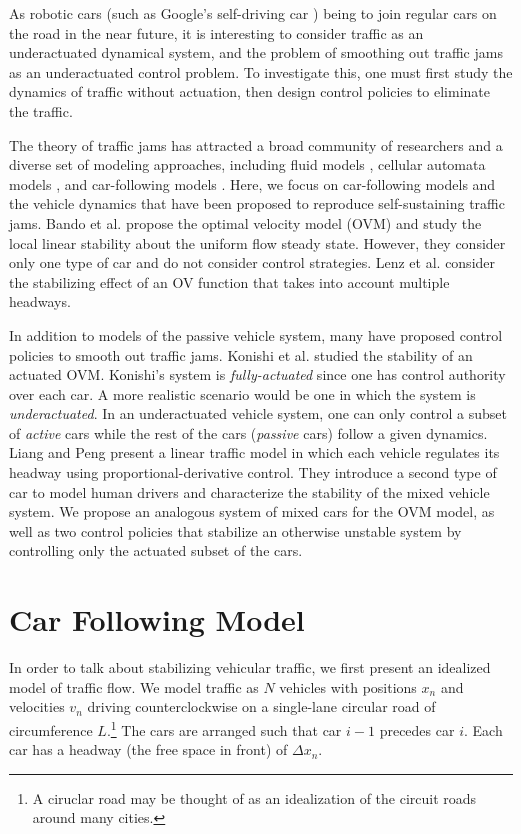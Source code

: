 \documentclass[10pt,twocolumn]{article}
\theoremstyle{ss}
\begin{document}
As robotic cars (such as Google's self-driving car \cite{Thrun}) being to join regular cars on the road in the near future, it is interesting to consider traffic as an underactuated dynamical system, and the problem of smoothing out traffic jams as an underactuated control problem. To investigate this, one must first study the dynamics of traffic without actuation, then design control policies to eliminate the traffic. %

The theory of traffic jams has attracted a broad community of researchers and a diverse set of modeling approaches, including fluid models \cite{Kerner}, cellular automata models \cite{Benjaafar}, and car-following models \cite{Bando,Lenz,Liang00,Liang99,Yanakiev}. Here, we focus on car-following models and the vehicle dynamics that have been proposed to reproduce self-sustaining traffic jams. Bando et al. \cite{Bando} propose the optimal velocity model (OVM) and study the local linear stability about the uniform flow steady state. However, they consider only one type of car and do not consider control strategies. Lenz et al. \cite{Lenz} consider the stabilizing effect of an OV function that takes into account multiple headways.

In addition to models of the passive vehicle system, many have proposed control policies to smooth out traffic jams. Konishi et al. \cite{Konishi} studied the stability of an actuated OVM. Konishi's system is {\em fully-actuated} since one has control authority over each car. A more realistic scenario would be one in which the system is {\em underactuated}. In an underactuated vehicle system, one can only control a subset of {\em active} cars while the rest of the cars ({\em passive} cars) follow a given dynamics. Liang and Peng \cite{Liang00,Liang99} present a linear traffic model in which each vehicle regulates its headway using proportional-derivative control. They introduce a second type of car to model human drivers and characterize the stability of the mixed vehicle system. We propose an analogous system of mixed cars for the OVM model, as well as two control policies that stabilize an otherwise unstable system by controlling only the actuated subset of the cars.

\section{Car Following Model}
In order to talk about stabilizing vehicular traffic, we first present an idealized model of traffic flow. We model traffic as $N$ vehicles with positions $x_n$ and velocities $v_n$ driving counterclockwise on a single-lane circular road of circumference $L$.\footnote{A ciruclar road may be thought of as an idealization of the circuit roads around many cities.} The cars are arranged such that car $i-1$ precedes car $i$. Each car has a headway (the free space in front) of $\Delta x_n$.
\end{document}
